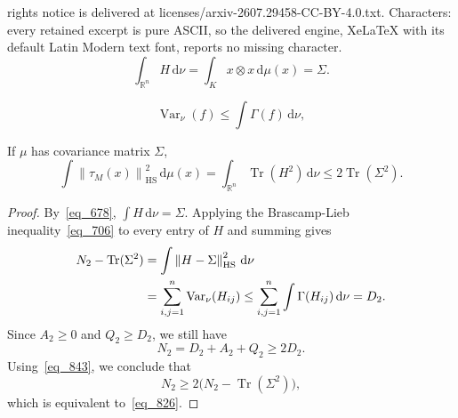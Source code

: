 \documentclass[10pt,a4paper]{amsart}
\newcommand{\HS}{\mathrm{HS}}
\newcommand{\R}{\mathbb R}
\newcommand{\Tr}{\operatorname{Tr}}
\newcommand{\Var}{\operatorname{Var}}
\newcommand{\dd}{\,\mathrm d}
\newcommand{\norm}[1]{\left\lVert #1\right\rVert}
\newcommand{\tauM}{\tau_M}
\begin{document}
rights notice is delivered at licenses/arxiv-2607.29458-CC-BY-4.0.txt. Characters: every retained excerpt is pure ASCII, so the delivered engine, XeLaTeX with its default Latin Modern text font, reports no missing character.
\begin{equation}\label{eq_678}
  \int_{\R^n}H\dd\nu
  =\int_Kx\otimes x\dd\mu(x)
  =\Sigma.
\end{equation}

\begin{equation}\label{eq_706}
  \Var_\nu(f)\leq\int\Gamma(f)\dd\nu,
\end{equation}

\begin{proposition}\label{prop_824}
If $\mu$ has covariance matrix $\Sigma$,
\begin{equation}\label{eq_826}
  \int\norm{\tauM(x)}_{\HS}^2\dd\mu(x)
  =\int_{\R^n}\Tr(H^2)\dd\nu
  \leq2\Tr(\Sigma^2).
\end{equation}
\end{proposition}

\begin{proof}
By~\eqref{eq_678}, $\int H\dd\nu=\Sigma$. Applying the
Brascamp-Lieb inequality~\eqref{eq_706} to every entry of $H$
and summing gives
\begin{align}
  N_2-\Tr(\Sigma^2)
  &=\int\norm{H-\Sigma}_{\HS}^2\dd\nu\notag\\
  &=\sum_{i,j=1}^n\Var_\nu(H_{ij})
  \leq\sum_{i,j=1}^n\int\Gamma(H_{ij})\dd\nu
  =D_2.
  \label{eq_843}
\end{align}
Since $A_2\geq0$ and $Q_2\geq D_2$, we still have
\[
  N_2=D_2+A_2+Q_2\geq2D_2.
\]
Using~\eqref{eq_843}, we conclude that
\[
  N_2\geq2\bigl(N_2-\Tr(\Sigma^2)\bigr),
\]
which is equivalent to~\eqref{eq_826}.
\end{proof}
\end{document}
